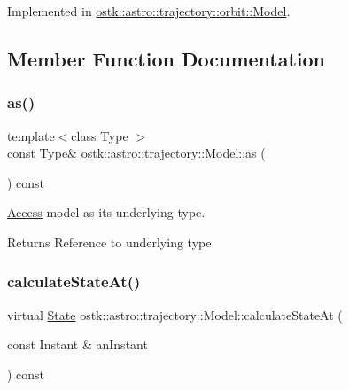 Implemented in \hyperlink{classostk_1_1astro_1_1trajectory_1_1orbit_1_1_model_a7593c3eccd08104b00dd4d7c9c6a4d99}{ostk\+::astro\+::trajectory\+::orbit\+::\+Model}.



\subsection{Member Function Documentation}
\mbox{\label{classostk_1_1astro_1_1trajectory_1_1_model_a53365ee40062f5571b664998a56701e3}} 
\subsubsection{\texorpdfstring{as()}{as()}}
{\footnotesize\ttfamily template$<$class Type $>$ \\
const Type\& ostk\+::astro\+::trajectory\+::\+Model\+::as (\begin{DoxyParamCaption}{ }\end{DoxyParamCaption}) const\hspace{0.3cm}{\ttfamily [inline]}}



\hyperlink{classostk_1_1astro_1_1_access}{Access} model as its underlying type. 

\begin{DoxyReturn}{Returns}
Reference to underlying type 
\end{DoxyReturn}
\mbox{\label{classostk_1_1astro_1_1trajectory_1_1_model_ad25eeaded2946bf73d44161b5f4e9a0e}} 
\subsubsection{\texorpdfstring{calculate\+State\+At()}{calculateStateAt()}}
{\footnotesize\ttfamily virtual \hyperlink{classostk_1_1astro_1_1trajectory_1_1_state}{State} ostk\+::astro\+::trajectory\+::\+Model\+::calculate\+State\+At (\begin{DoxyParamCaption}\item[{const Instant \&}]{an\+Instant }\end{DoxyParamCaption}) const\hspace{0.3cm}{\ttfamily [pure virtual]}}




